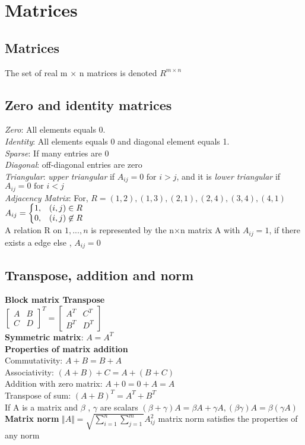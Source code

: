 \section{Matrices}
\subsection{Matrices}
The set of real m × n matrices is denoted $R^{m \times n}$
\subsection{Zero and identity matrices}
\textbullet \textit{Zero}: All elements equals 0.\\
\textbullet \textit{Identity}: All elements equals 0 and diagonal element equals 1.\\
\textbullet \textit{Sparse}: If many entries are 0\\
\textbullet \textit{Diagonal}: off-diagonal entries are zero\\
\textbullet \textit{Triangular}: \textit{upper triangular} if $A_{ij} = 0 \text{ for } i>j$, and it is \textit{lower triangular} if $A_{ij} =0 \text{ for } i<j$\\
\textbullet \textit{Adjacency Matrix}: 
For, $R={(1,2), (1,3), (2,1), (2,4), (3,4), (4,1)}$\\
$
A_{ij} = \left\{
  \begin{array}{@{}ll@{}}
    1, & (i,j) \in R\\
    0, & (i, j) \not\in R
  \end{array}\right.
$\\
A relation R on ${1,...,n}$ is represented by the n×n matrix A with $A_{ij} = 1$, if there exists a edge else , $A_{ij} = 0$
\subsection{Transpose, addition and norm}
\textbf{Block matrix Transpose}\\
$
\begin{bmatrix}
    A & B \\
    C & D
    
\end{bmatrix}^{T}= 
\begin{bmatrix}
    A^T & C^T \\
    B^T & D^T
\end{bmatrix}
$\\
\textbf{Symmetric matrix}: $A = A^T$\\
\textbf{Properties of matrix addition}\\
\textbullet Commutativity: $A+B=B+A$\\
\textbullet Associativity: $(A + B) + C = A + (B + C)$\\
\textbullet Addition with zero matrix: $A+0=0+A=A$\\
\textbullet Transpose of sum:  $(A+B)^T = A^T +B^T$\\
If A is a matrix and $\beta$ , $\gamma$ are scalars
$(\beta + \gamma)A = \beta A + \gamma A, 
(\beta \gamma)A = \beta(\gamma A)
$\\
\textbf{Matrix norm}
$\Vert A \Vert = \sqrt{\sum_{i=1}^n\sum_{j=1}^m} A^2_{ij}$
matrix norm satisfies the properties of any norm

